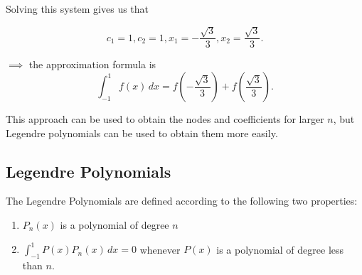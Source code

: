\documentclass[12pt]{article}
\begin{document}
Solving this system gives us that

\[
c_1 = 1, c_2 = 1, x_1 = - \frac{\sqrt{3}}{3}, x_2 = \frac{\sqrt{3}}{3}
.\]

$\implies$ the approximation formula is 
\[
  \int_{-1}^{1} f(x) \, dx = f\left(-\frac{\sqrt{3}}{3}\right) +
  f\left(\frac{\sqrt{3}}{3}\right)
.\]

This approach can be used to obtain the nodes and coefficients for larger $n$,
but Legendre polynomials can be used to obtain them more easily.

\subsection{Legendre Polynomials}

The Legendre Polynomials are defined according to the following two properties:

\begin{enumerate}
\item $P_n(x)$ is a polynomial of degree $n$
\item $\int_{-1}^{1} P(x)P_n(x) \, dx = 0$ whenever $P(x)$ is a polynomial of
  degree less than $n$.
\end{enumerate}
\end{document}
